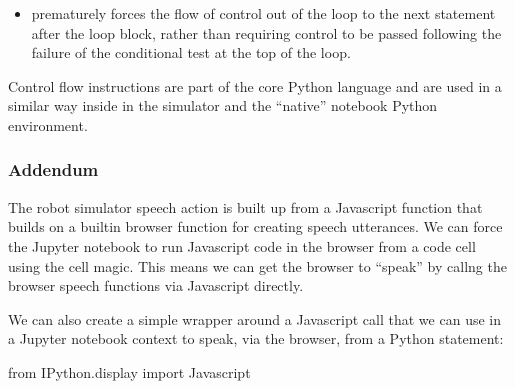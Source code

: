 \documentclass[letterpaper,10pt,english]{sphinxmanual}
\begin{document}
{\begin{itemize}
\item {} 
 prematurely forces the flow of control out of the loop to the next statement after the loop block, rather than requiring control to be passed following the failure of the conditional test at the top of the loop.

\end{itemize}

Control flow instructions are part of the core Python language and are used in a similar way inside in the simulator and the “native” notebook Python environment.


\subsubsection{Addendum}
\label{\detokenize{content/02_Robot_Lab/Section_00_01:Addendum}}
The robot simulator speech action is built up from a Javascript function that builds on a built\sphinxhyphen{}in browser function for creating speech utterances. We can force the Jupyter notebook to run Javascript code in the browser from a code cell using the  cell magic. This means we can get the browser to “speak” by callng the browser speech functions via Javascript directly.


{
\begin{sphinxVerbatim}[commandchars=\\\{\}]
\llap{\color{nbsphinxin}[ ]:\,\hspace{\fboxrule}\hspace{\fboxsep}}
 
\end{sphinxVerbatim}
}

We can also create a simple wrapper around a Javascript call that we can use in a Jupyter notebook context to speak, via the browser, from a Python statement:

{
\begin{sphinxVerbatim}[commandchars=\\\{\}]
\llap{\color{nbsphinxin}[ ]:\,\hspace{\fboxrule}\hspace{\fboxsep}}from IPython.display import Javascript


\end{sphinxVerbatim}}}
\end{document}
